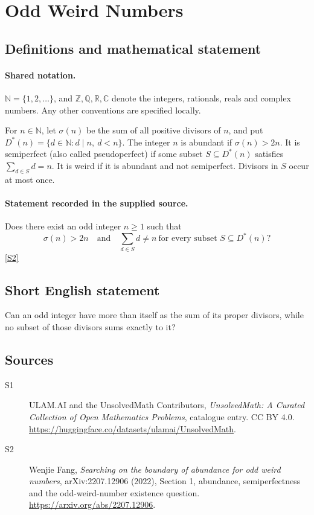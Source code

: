 \documentclass[11pt]{article}
\newcommand{\sref}[2]{\hyperlink{source:#1:#2}{[S#2]}}
\begin{document}
\section{Odd Weird Numbers}\label{statement}

\subsection{Definitions and mathematical statement}

\paragraph{Shared notation.}$\mathbb N=\{1,2,\ldots\}$, and $\mathbb Z,\mathbb Q,\mathbb R,\mathbb C$ denote the integers, rationals, reals and complex numbers. Any other conventions are specified locally.


For \(n\in\mathbb N\), let \(\sigma(n)\) be the sum of all
positive divisors of \(n\), and put
\(D^*(n)=\{d\in\mathbb N:d\mid n,\ d<n\}\).
The integer \(n\) is abundant if \(\sigma(n)>2n\).
It is semiperfect (also called pseudoperfect) if some subset
\(S\subseteq D^*(n)\) satisfies \(\sum_{d\in S}d=n\).
It is weird if it is abundant and not semiperfect.
Divisors in \(S\) occur at most once.
\paragraph{Statement recorded in the supplied source.}
Does there exist an odd integer \(n\ge1\) such that
\[
 \sigma(n)>2n\quad\text{and}\quad
 \sum_{d\in S}d\ne n\ \text{for every subset }S\subseteq D^*(n)?
\] \sref{statement}{2}
\subsection{Short English statement}
Can an odd integer have more than itself as the sum of its proper divisors, while no subset of those divisors sums exactly to it?
\subsection{Sources}
\begin{description}
\item[\hypertarget{source:statement:1}{S1}] ULAM.AI and the UnsolvedMath Contributors, \emph{UnsolvedMath: A Curated Collection of Open Mathematics Problems}, catalogue entry. CC BY 4.0. \url{https://huggingface.co/datasets/ulamai/UnsolvedMath}.
\item[\hypertarget{source:statement:2}{S2}] Wenjie Fang, \emph{Searching on the boundary of abundance for odd weird numbers}, arXiv:2207.12906 (2022), Section 1, abundance, semiperfectness and the odd-weird-number existence question. \url{https://arxiv.org/abs/2207.12906}.
\end{description}
\label{end:statement}
\end{document}
